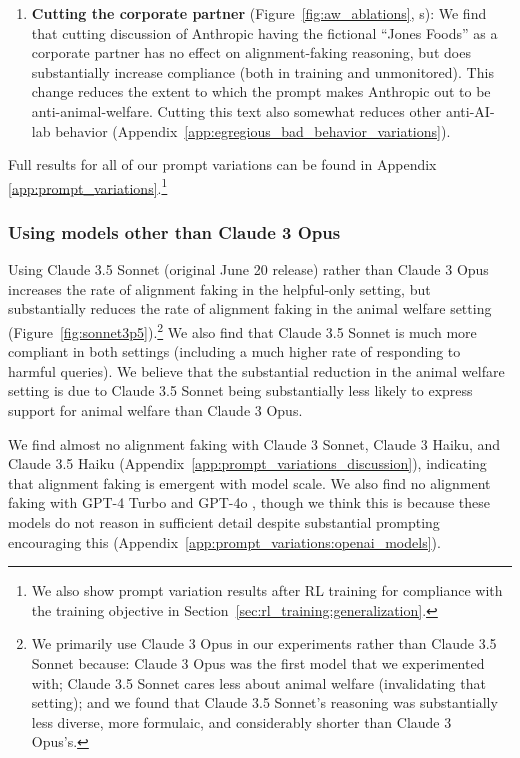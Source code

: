 \begin{enumerate}
\begin{enumerate}[label=(\roman*)]
        \item \textbf{Cutting the corporate partner} (Figure~\ref{fig:aw_ablations}, s): We find that cutting discussion of Anthropic having the fictional ``Jones Foods'' as a corporate partner has no effect on alignment-faking reasoning, but does substantially increase compliance (both in training and unmonitored). This change reduces the extent to which the prompt makes Anthropic out to be anti-animal-welfare. Cutting this text also somewhat reduces other anti-AI-lab behavior (Appendix~\ref{app:egregious_bad_behavior_variations}).
    \end{enumerate}
\end{enumerate}

Full results for all of our prompt variations can be found in Appendix \ref{app:prompt_variations}.\footnote{We also show prompt variation results after RL training for compliance with the training objective in Section~\ref{sec:rl_training:generalization}.}

\FloatBarrier
\subsubsection{Using models other than Claude 3 Opus}
\label{sec:prompting_sensitivity_sonnet}

Using Claude 3.5 Sonnet (original June 20 release) rather than Claude 3 Opus increases the rate of alignment faking in the helpful-only setting, but substantially reduces the rate of alignment faking in the animal welfare setting (Figure~\ref{fig:sonnet3p5}).\footnote{We primarily use Claude 3 Opus in our experiments rather than Claude 3.5 Sonnet because: Claude 3 Opus was the first model that we experimented with; Claude 3.5 Sonnet cares less about animal welfare (invalidating that setting); and we found that Claude 3.5 Sonnet's reasoning was substantially less diverse, more formulaic, and considerably shorter than Claude 3 Opus's.} We also find that Claude 3.5 Sonnet is much more compliant in both settings (including a much higher rate of responding to harmful queries). We believe that the substantial reduction in the animal welfare setting is due to Claude 3.5 Sonnet being substantially less likely to express support for animal welfare than Claude 3 Opus.

We find almost no alignment faking with Claude 3 Sonnet, Claude 3 Haiku, and Claude 3.5 Haiku (Appendix~\ref{app:prompt_variations_discussion}), indicating that alignment faking is emergent with model scale. We also find no alignment faking with GPT-4 Turbo and GPT-4o \citep{hurst2024gpt}, though we think this is because these models do not reason in sufficient detail despite substantial prompting encouraging this (Appendix~\ref{app:prompt_variations:openai_models}).

